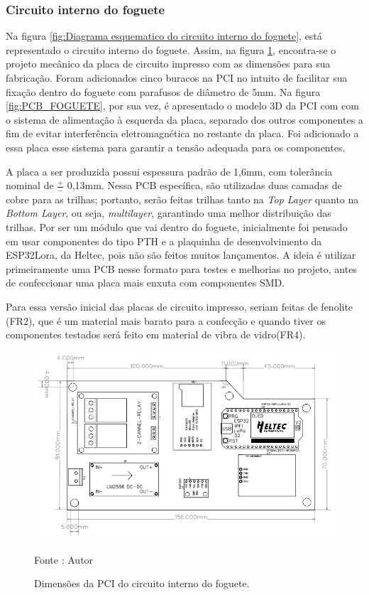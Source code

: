 \subsubsection{Circuito interno do foguete}
\par Na figura \ref{fig:Diagrama esquematico do circuito interno do foguete}, está representado o circuito interno do foguete. Assim, na figura \ref{fig:PCIFOGUETE}, encontra-se o  projeto mecânico da placa de circuito impresso com as dimensões para sua fabricação. Foram adicionados cinco buracos na PCI no intuito de facilitar sua fixação dentro do foguete com parafusos de diâmetro de 5mm. Na figura \ref{fig:PCB_FOGUETE}, por sua vez, é apresentado o modelo 3D da PCI com com o sistema de alimentação à esquerda da placa, separado dos outros componentes a fim de evitar interferência eletromagnética no restante da placa. Foi adicionado a essa placa esse sistema para garantir a tensão adequada para os componentes. 
\par A placa a ser produzida possui espessura padrão de 1,6mm, com tolerância nominal de $\frac{+}{-}$ 0,13mm. Nessa PCB específica, são utilizadas duas camadas de cobre para as trilhas; portanto, serão feitas trilhas tanto na \textit{Top Layer} quanto na \textit{Bottom Layer}, ou seja, \textit{multilayer}, garantindo uma melhor distribuição das trilhas. Por ser um módulo que vai dentro do foguete, inicialmente foi pensado em usar componentes do tipo PTH e a plaquinha de desenvolvimento da ESP32Lora, da Heltec, pois não são feitos muitos lançamentos. A ideia é utilizar primeiramente uma PCB nesse formato para testes e melhorias no projeto, antes de confeccionar uma placa mais enxuta com componentes SMD. 
\par Para essa versão inicial das placas de circuito impresso, seriam feitas de fenolite (FR2), que é um material mais barato para a confecção e quando tiver os componentes testados será feito em material de vibra de vidro(FR4)\cite{CONCEITOpci}.

\begin{figure}[H]
  \centering
  \includegraphics[scale=0.5]{figuras/PCB-FOGUETE COTAGEM.png}
  \caption{ Dimensões da PCI do circuito interno do foguete. } 
  {\footnotesize Fonte : Autor } 
  \label{fig:PCIFOGUETE}
\end{figure}


